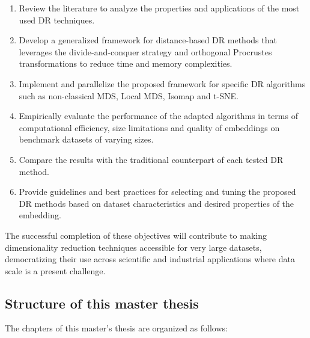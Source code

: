 \begin{enumerate}
    \item Review the literature to analyze the properties and applications of the most used DR techniques.
    \item Develop a generalized framework for distance-based DR methods that leverages the divide-and-conquer strategy and orthogonal Procrustes transformations to reduce time and memory complexities.
    \item Implement and parallelize the proposed framework for specific DR algorithms such as non-classical MDS, Local MDS, Isomap and t-SNE.
    \item Empirically evaluate the performance of the adapted algorithms in terms of computational efficiency, size limitations and quality of embeddings on benchmark datasets of varying sizes.
    \item Compare the results with the traditional counterpart of each tested DR method.
    \item Provide guidelines and best practices for selecting and tuning the proposed DR methods based on dataset characteristics and desired properties of the embedding.
\end{enumerate}

The successful completion of these objectives will contribute to making  dimensionality reduction techniques accessible for very large datasets, democratizing their use across scientific and industrial applications where data scale is a present challenge.

\subsection{Structure of this master thesis}

The chapters of this master's thesis are organized as follows:

